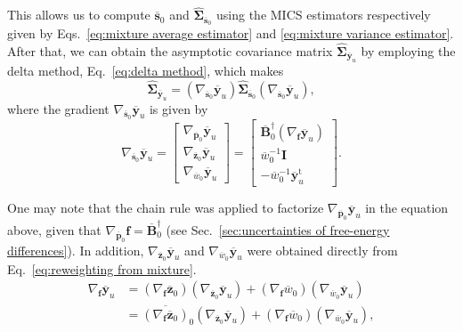 \documentclass[aip,jcp,reprint,amsmath,amssymb]{revtex4-1}
\newcommand{\mt}[1]{\boldsymbol{\mathbf{#1}}}           %
\newcommand{\vt}[1]{\boldsymbol{\mathbf{#1}}}           %
\newcommand{\tr}[1]{#1^\text{t}}                        %
\begin{document}
This allows us to compute $\overline{\vt s}_0$ and $\hat{\mt \Sigma}_{\overline{\vt s}_0}$ using the MICS estimators respectively given by Eqs.~\eqref{eq:mixture average estimator} and \eqref{eq:mixture variance estimator}. After that, we can obtain the asymptotic covariance matrix $\hat{\mt \Sigma}_{\overline{\vt y}_u}$ by employing the delta method, Eq.~\eqref{eq:delta method}, which makes
\begin{equation*}
\hat{\mt \Sigma}_{\overline{\vt y}_u} = (\nabla_{\overline{\vt s}_0} {\overline{\vt y}_u}) \hat{\mt \Sigma}_{\overline{\vt s}_0} (\nabla_{\overline{\vt s}_0} {\overline{\vt y}_u}),
\end{equation*}
where the gradient $\nabla_{\overline{\vt s}_0} {\overline{\vt y}_u}$ is given by
\begin{equation*}
\nabla_{\overline{\vt s}_0} {\overline{\vt y}_u} = \left[\begin{array}{c}
\nabla_{\overline{\vt p}_0} {\overline{\vt y}_u} \\
\nabla_{\overline{\vt z}_0} {\overline{\vt y}_u} \\
\nabla_{\overline{w}_0} {\overline{\vt y}_u}
\end{array}\right] = \left[\begin{array}{c}
\overline{\mt B}_0^\dag (\nabla_{\vt f} {\overline{\vt y}_u}) \\
\overline{w}_0^{-1} {\mt I} \\
-\overline{w}_0^{-1} \tr{\overline{\vt y}}_u
\end{array}\right].
\end{equation*}

One may note that the chain rule was applied to factorize $\nabla_{\overline{\vt p}_0} {\overline{\vt y}_u}$ in the equation above, given that $\nabla_{\overline{\vt p}_0} {\vt f} = \overline{\mt B}_0^\dag$ (see Sec.~\ref{sec:uncertainties of free-energy differences}). In addition, $\nabla_{\overline{\vt z}_0} {\overline{\vt y}_u}$ and $\nabla_{\overline{w}_0} {\overline{\vt y}_u}$ were obtained directly from Eq.~\eqref{eq:reweighting from mixture}.
\begin{align*}
\nabla_{\vt f} {\overline{\vt y}_u} &= (\nabla_{\vt f} {\overline{\vt z}_0}) (\nabla_{\overline{\vt z}_0} {\overline{\vt y}_u}) + (\nabla_{\vt f} {\overline{w}_0}) (\nabla_{\overline{w}_0} {\overline{\vt y}_u}) \\
&= \overline{(\nabla_{\vt f} {\overline{\vt z}_0})}_0 (\nabla_{\overline{\vt z}_0} {\overline{\vt y}_u}) + (\nabla_{\vt f} {\overline{w}_0}) (\nabla_{\overline{w}_0} {\overline{\vt y}_u}),
\end{align*}
\end{document}
